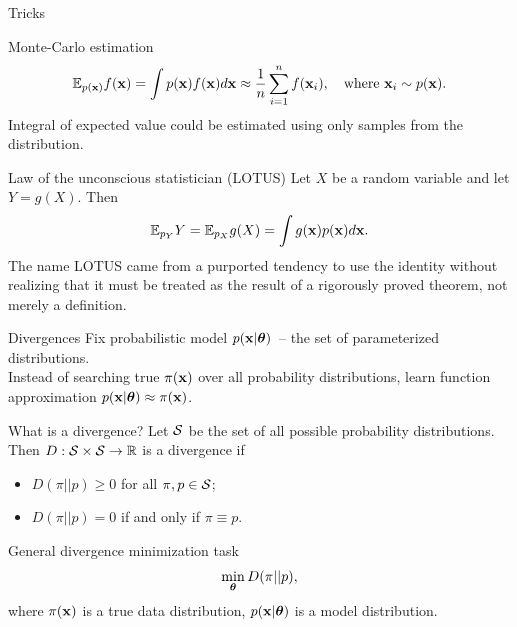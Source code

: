 \begin{frame}{Tricks}
	\begin{block}{Monte-Carlo estimation}
		\vspace{-0.5cm}
		\[
			\mathbb{E}_{p(\mathbf{x})} f(\mathbf{x}) = \int p(\mathbf{x}) f(\mathbf{x}) d \mathbf{x} \approx \frac{1}{n} \sum_{i=1}^n f(\mathbf{x}_i), \quad 
			\text{where } \mathbf{x}_i \sim p(\mathbf{x}).
		\]
		Integral of expected value could be estimated using only samples from the distribution.
	\end{block}
	\begin{block}{Law of the unconscious statistician (LOTUS)}
		Let $X$ be a random variable and let $Y=g(X)$. Then
		\[
			\mathbb{E}_{p_Y} Y = \mathbb{E}_{p_X} g(X) = \int g(\mathbf{x}) p(\mathbf{x}) d \mathbf{x}.
		\]
		The name LOTUS came from a purported tendency to use the identity without realizing that it must be treated as the result of a rigorously proved theorem, not merely a definition.
	\end{block}
\end{frame}
\begin{frame}{Divergences}
	Fix probabilistic model $p(\mathbf{x} | \boldsymbol{\theta})$~-- the set of parameterized distributions. \\
	Instead of searching true $\pi(\mathbf{x})$ over all probability distributions, learn function approximation $p(\mathbf{x} | \boldsymbol{\theta}) \approx \pi(\mathbf{x})$.
	\begin{block}{What is a divergence?}
		Let $\mathcal{S}$ be the set of all possible probability distributions. Then $D: \mathcal{S} \times \mathcal{S} \rightarrow \mathbb{R}$ is a divergence if 
		\begin{itemize}
			\item $D(\pi || p) \geq 0$ for all $\pi, p \in \mathcal{S}$;
			\item $D(\pi || p) = 0$ if and only if $\pi \equiv p$.
		\end{itemize}
	\end{block}
	\begin{block}{General divergence minimization task}
		\vspace{-0.3cm}
		\[
		\min_{\boldsymbol{\theta}} D(\pi || p),
		\]
		where $\pi(\mathbf{x})$ is a true data distribution, $p(\mathbf{x} | \boldsymbol{\theta})$ is a model distribution.
	\end{block}
\end{frame}
